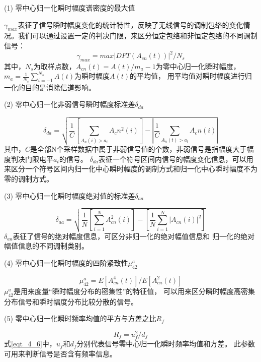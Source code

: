 (1) 零中心归一化瞬时幅度谱密度的最大值\par
$\gamma_{max}$表征了信号瞬时幅度变化的统计特性，反映了无线信号的调制包络的变化情况。我们可以通过设置一定的判决门限，来区分恒定包络和非恒定包络的不同调制信号：
\begin{equation}
\label{eqt_4_2}
\gamma_{max}=max|DFT(A_{cn}(t))|^{2}/N_s
\end{equation}
其中，$N_s$为取样点数，$A_{cn}(t)=A(t)/m_a-1$为零中心归一化瞬时幅度，
$m_a=\frac{1}{N_s}\sum_{i=-1}^{N_s}A(t)$为瞬时幅度$A(t)$的平均值，
用平均值对瞬时幅度进行归一化的目的是消除信道影响。\par

(2) 零中心归一化非弱信号瞬时幅度标准差$\delta_{da}$\par
\begin{equation}
\label{eqt_4_3}
\delta_{da}=\sqrt{\frac{1}{C}\left[\sum_{A_n(i)>a_t} A_cn^2(i)\right]
	- \left|\frac{1}{C} \sum_{A_n(t)>a_t} A_cn(i)\right|}
\end{equation}
其中，$C$是全部N个采样数据中属于非弱信号值的个数，非弱信号是指幅度大于幅度判决门限电平$a_t$的信号。
$\delta_{da}$表征一个符号区间内信号的幅度变化信息，可以用来区分一个符号区间内归一化中心瞬时幅度的调制方式和归一化中心瞬时幅度不为零的调制方式。

(3) 零中心归一化瞬时幅度绝对值的标准差$\delta_{aa}$\par
\begin{equation}
\label{eqt_4_4}
\delta_{aa} = \sqrt{\frac{1}{N}\left[\sum_{i=1}^{N} A_{cn}^2(i)\right]
	- \left[\frac{1}{N} \sum_{i=1}^{N} \left|A_{cn}(i)\right|^2\right]}
\end{equation}
$\delta_{aa}$表征了信号的绝对幅度信息，可区分非归一化的绝对幅值信息和
归一化的绝对幅值信息的不同调制类别。

(4) 零中心归一化瞬时幅度的四阶紧致性$\mu_{42}^{a}$\par
\begin{equation}
\label{eqt_4_5}
\mu_{42}^{a} = E\left[A_{cn}^{4} (t) \right] / E\left[A_{cn}^{2} (t) \right]
\end{equation}
$\mu_{42}^{a}$是用来度量“瞬时幅度分布的密集性”的特征值，
可以用来区分瞬时幅度高密集分布信号和瞬时幅度分布比较分散的信号。

(5) 零中心归一化瞬时频率均值的平方与方差之比$R_f$\par
\begin{equation}
\label{eqt_4_6}
R_f = u_f^2 / d_f
\end{equation}
式\ref{eqt_4_6}中，$u_f$和$d_f$分别代表信号零中心归一化瞬时频率均值和方差。
此参数可用来判断信号是否含有频率信息。

